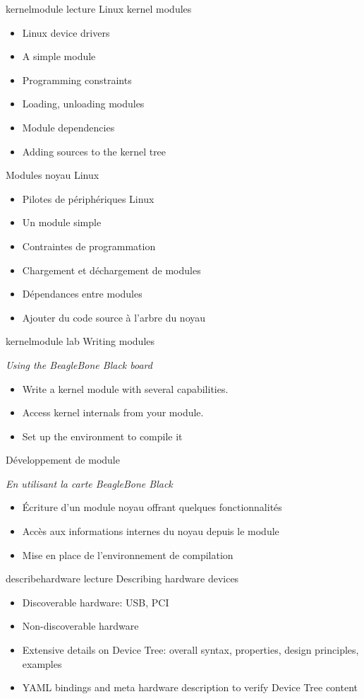 {kernelmodule}
{lecture}
{Linux kernel modules}
{
  \begin{itemize}
  \item Linux device drivers
  \item A simple module
  \item Programming constraints
  \item Loading, unloading modules
  \item Module dependencies
  \item Adding sources to the kernel tree
  \end{itemize}
}
{Modules noyau Linux}
{
  \begin{itemize}
  \item Pilotes de périphériques Linux
  \item Un module simple
  \item Contraintes de programmation
  \item Chargement et déchargement de modules
  \item Dépendances entre modules
  \item Ajouter du code source à l'arbre du noyau
  \end{itemize}
}
{kernelmodule}
{lab}
{Writing modules}
{
  {\em Using the BeagleBone Black board}
  \begin{itemize}
  \item Write a kernel module with several capabilities.
  \item Access kernel internals from your module.
  \item Set up the environment to compile it
  \end{itemize}
}
{Développement de module}
{
  {\em En utilisant la carte BeagleBone Black}
  \begin{itemize}
  \item Écriture d'un module noyau offrant quelques fonctionnalités
  \item Accès aux informations internes du noyau depuis le module
  \item Mise en place de l'environnement de compilation
  \end{itemize}
}
{describehardware}
{lecture}
{Describing hardware devices}
{
  \begin{itemize}
  \item Discoverable hardware: USB, PCI
  \item Non-discoverable hardware
  \item Extensive details on Device Tree: overall syntax, properties,
    design principles, examples
  \item YAML bindings and meta hardware description to verify Device Tree
    content
  \end{itemize}
}
